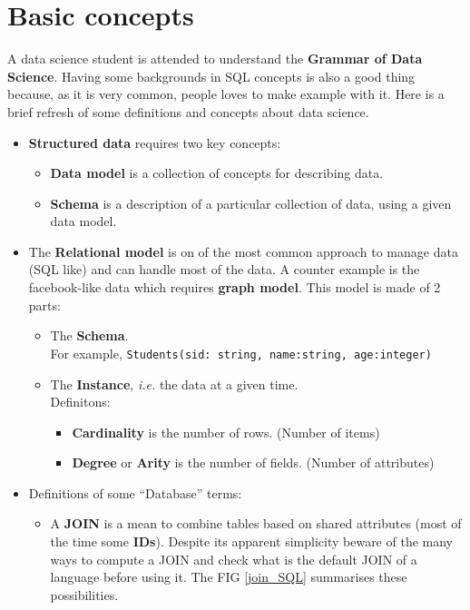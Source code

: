 \documentclass[a4paper,11pt,twoside]{article}
\begin{document}
\section{Basic concepts}

A data science student is attended to understand the \textbf{Grammar of Data Science}. Having some backgrounds in SQL concepts is also a good thing because, as it is very common, people loves to make example with it. Here is a brief refresh of some definitions and concepts about data science.

\begin{itemize}
 \item {\bf Structured data} requires two key concepts:
 \begin{itemize}
  \item {\bf Data model} is a collection of concepts for describing data.
  \item {\bf Schema} is a description of a particular collection of data, using a given data model.
 \end{itemize}
 \item The {\bf Relational model} is on of the most common approach to manage data (SQL like) and can handle most of the data. A counter example is the facebook-like data which requires {\bf graph model}. This model is made of 2 parts:
 \begin{itemize}
  \item The {\bf Schema}. \\ For example, \verb+Students(sid: string, name:string, age:integer)+
  \item The {\bf Instance}, {\it i.e.} the data at a given time. \\
  Definitons:
  \begin{itemize}
   \item {\bf Cardinality} is the number of rows. (Number of items)
   \item {\bf Degree} or {\bf Arity} is the number of fields. (Number of attributes)
  \end{itemize}
 \end{itemize}
 \item Definitions of some ``Database'' terms:
 \begin{itemize}
  \item A {\bf JOIN} is a mean to combine tables based on shared attributes (most of the time some \textbf{IDs}). Despite its apparent simplicity beware of the many ways to compute a JOIN and check what is the default JOIN of a language before using it. The FIG \ref{join_SQL} summarises these possibilities.

\end{itemize}
\end{itemize}
\end{document}
